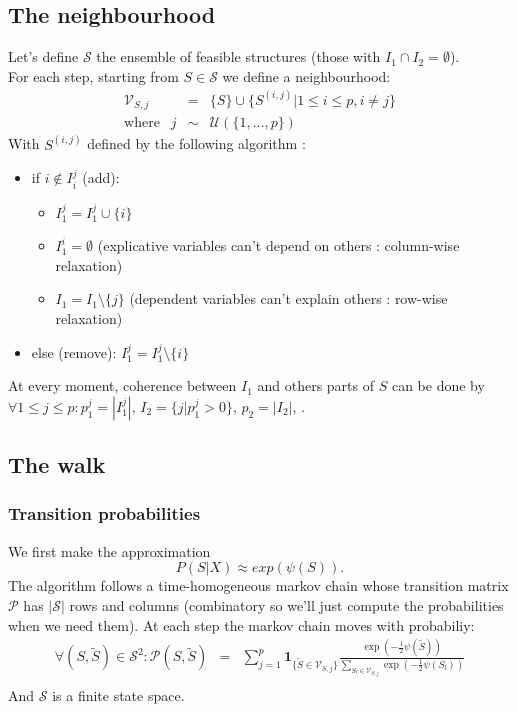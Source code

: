 \documentclass[11pt,a4paper]{article}
\begin{document}
	\subsection{The neighbourhood}
	Let's define $\mathcal{S}$ the ensemble of feasible structures (those with $I_1\cap I_2=\emptyset$).
	\\
	For each step, starting from $S \in \mathcal{S}$ we define a neighbourhood:
		\begin{eqnarray}
		\mathcal{V}_{S,j}&=& \{S \}\cup \{ S^{(i,j)} |1\leq i \leq p, i\neq j  \} \\
		\textrm{where }\ \ j &\sim & \mathcal{U}(\{1,\dots,p\}) 
	\end{eqnarray}	
	With $S^{(i,j)}$ defined by the following algorithm :
	\begin{itemize}
		\item if $i \notin I_i^j$ (add): 
			\begin{itemize}
				\item $I_1^j=I_1^j\cup \{i\}$
				\item $I_1^i=\emptyset$ (explicative variables can't depend on others : column-wise relaxation)
				\item $I_1=I_1 \setminus \{j\}$ (dependent variables can't explain others : row-wise relaxation) 
			\end{itemize}			 
		\item else (remove): $I_1^j=I_1^j\setminus \{i\}$
	\end{itemize}
	
	\smallskip
	At every moment, coherence between $I_1$ and others parts of $S$ can be done by $\forall 1\leq j\leq p :  p_1^j=|I_1^j|$, $I_2=\{j |p_1^j>0 \}$, $p_2= |I_2|$, .
		
	\subsection{The walk}
	\subsubsection{Transition probabilities}
	We first make the approximation
	\begin{equation}
		P(S|X)\approx exp(\psi(S)).
	\end{equation}
	The algorithm follows a time-homogeneous markov chain whose transition matrix $\mathcal{P}$ has $|\mathcal{S}|$ rows and columns (combinatory so we'll just compute the probabilities when we need them).
	At each step the markov chain moves with probabiliy:
	\begin{eqnarray}
			\forall (S,\tilde{S}) \in \mathcal{S}^2 : \mathcal{P}(S,\tilde{S})&=&\sum_{j=1}^p \mathbf{1}_{ \{\tilde{S}\in \mathcal{V}_{S,j}\} }\frac{\exp(-\frac{1}{2} \psi(\tilde{S}))}{\sum_{S_l\in \mathcal{V}_{S,j}}\exp(-\frac{1}{2}\psi(S_l))} \\
	\end{eqnarray}
	And $\mathcal{S}$ is a finite state space.%
	 
\end{document}
